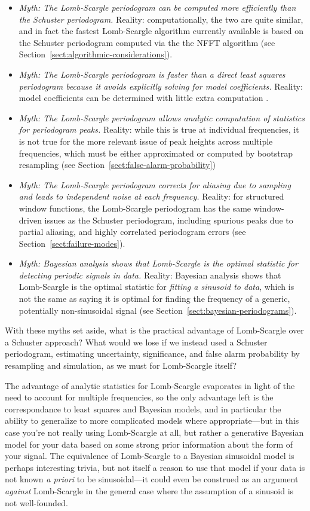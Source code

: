\documentclass[preprint]{aastex}
\newcommand{\Sect}[1]{Section~\ref{sect:#1}}
\newcommand{\sect}[1]{\Sect{#1}}
\begin{document}
\begin{itemize}
  \item {\it Myth: The Lomb-Scargle periodogram can be computed more efficiently
    than the Schuster periodogram.} Reality: computationally, the two
    are quite similar, and in fact the fastest Lomb-Scargle algorithm currently
    available is based on the Schuster periodogram computed via the
    the NFFT algorithm (see \sect{algorithmic-considerations}).
  \item {\it Myth: The Lomb-Scargle periodogram is faster than a direct
    least squares periodogram because it avoids explicitly solving for
    model coefficients.}
    Reality: model coefficients can be determined with little extra
    computation \citep[see the discussion in][]{ICVG2014}.
  \item {\it Myth: The Lomb-Scargle periodogram allows analytic computation of
    statistics for periodogram peaks.} Reality: while this is true at
    individual frequencies, it is not true for the more relevant issue of
    peak heights across multiple frequencies, which must be either approximated
    or computed by bootstrap resampling (see \sect{false-alarm-probability})
  \item {\it Myth: The Lomb-Scargle periodogram corrects for aliasing due to
    sampling and leads to independent noise at each frequency.}
    Reality: for structured window functions, the Lomb-Scargle
    periodogram has the same window-driven issues as the Schuster
    periodogram, including spurious peaks due to partial aliasing, and
    highly correlated periodogram errors (see \sect{failure-modes}).
  \item {\it Myth: Bayesian analysis shows that Lomb-Scargle is the optimal
    statistic for detecting periodic signals in data.} Reality: Bayesian
    analysis shows that Lomb-Scargle is the optimal statistic for
    {\it fitting a sinusoid to data}, which is not the same as saying it
    is optimal for finding the frequency of a generic, potentially
    non-sinusoidal signal (see \sect{bayesian-periodograms}).
\end{itemize}
With these myths set aside, what is the practical advantage of Lomb-Scargle
over a Schuster approach?
What would we lose if we instead used a Schuster periodogram,
estimating uncertainty, significance, and false alarm probability by
resampling and simulation, as we must for Lomb-Scargle itself?

The advantage of analytic statistics for Lomb-Scargle evaporates in light of the
need to account for multiple frequencies, so the only advantage left is the
correspondance to least squares and Bayesian models, and in particular the
ability to generalize to more complicated models where appropriate---but in
this case you're not really using Lomb-Scargle at all,
but rather a generative Bayesian model for your
data based on some strong prior information about the form of your signal.
The equivalence of Lomb-Scargle to a Bayesian sinusoidal model is perhaps
interesting trivia, but not itself a reason to use that model if your data
is not known {\it a priori} to be sinusoidal---it could even be construed as
an argument {\it against} Lomb-Scargle in the general case where the assumption
of a sinusoid is not well-founded.
\end{document}
